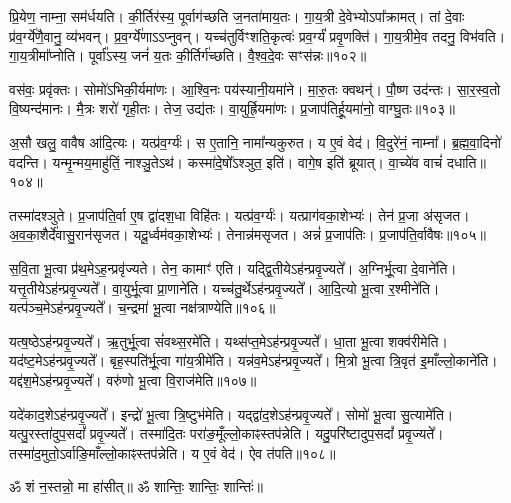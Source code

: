 प्रि॒येण॒ नाम्ना॒ सम॑र्धयति। 
की॒र्तिर॑स्य॒ पूर्वाग॑च्छति ज॒नता॑माय॒तः। 
गा॒य॒त्री दे॒वेभ्योऽपा᳚क्रामत्। 
तां दे॒वाः प्र॑व॒र्ग्ये॑णै॒वानु॒ व्य॑भवन्। 
प्र॒व॒र्ग्ये॑णाऽऽप्नुवन्। 
यच्च॑तुर्विꣳशति॒कृत्वः॑ प्रव॒र्ग्यं॑ प्रवृ॒णक्ति॑। 
गा॒य॒त्रीमे॒व तदनु॒ विभ॑वति। 
गा॒य॒त्रीमा᳚प्नोति। 
पूर्वा᳚ऽस्य॒ जनं॑ य॒तः की॒र्तिर्ग॑च्छति। 
वै॒श्व॒दे॒वः सꣳस॑न्नः॥१०२॥

वस॑वः॒ प्रवृ॑क्तः। 
सोमो॑ऽभिकी॒र्यमा॑णः। 
आ॒श्वि॒नः पय॑स्यानी॒य\-मा॑ने। 
मा॒रु॒तः क्वथन्॑। 
पौ॒ष्ण उद॑न्तः। 
सा॒र॒स्व॒तो वि॒ष्यन्द॑मानः। 
मै॒त्रः  शरो॑ गृही॒तः। 
तेज॒ उद्य॑तः। 
वा॒युर्ह्रि॒यमा॑णः। 
प्र॒जाप॑तिर्\mbox{}हू॒यमा॑नो॒ वाग्घु॒तः॥१०३॥

अ॒सौ खलु॒ वावैष आ॑दि॒त्यः। 
यत्प्र॑व॒र्ग्यः॑। 
स ए॒तानि॒ नामा᳚न्यकुरुत। 
य ए॒वं वेद॑। 
वि॒दुरे॑नं॒ नाम्ना᳚। 
ब्र॒ह्म॒वा॒दिनो॑ वदन्ति। 
यन्मृ॒न्मय॒माहु॑तिं॒ नाश्ञु॒तेऽथ॑। 
कस्मा॑दे॒षो᳚ऽश्ञुत॒ इति॑। 
वागे॒ष इति॑ ब्रूयात्। 
वा॒च्ये॑व वाचं॑ दधाति॥१०४॥

तस्मा॑दश्ञुते। 
प्र॒जाप॑ति॒र्वा ए॒ष द्वा॑दश॒धा विहि॑तः। 
यत्प्र॑व॒र्ग्यः॑। 
यत्प्राग॑वका॒शेभ्यः॑। 
तेन॑ प्र॒जा अ॑सृजत। 
अ॒व॒का॒शैर्दे॑वासु॒रान॑सृजत। 
यदू॒र्ध्वम॑वका॒शेभ्यः॑। 
तेनान्न॑म\-सृजत। 
अन्नं॑ प्र॒जाप॑तिः। 
प्र॒जाप॑ति॒र्वावैषः॥१०५॥
\anuvakamend[व॒द॒न्ति॒ त॒नुवा॒ सꣳस॑न्नो हू॒यमा॑नो॒ वाग्घु॒तो द॑धात्ये॒षः]

स॒वि॒ता भू॒त्वा प्र॑थ॒मेऽह॒न्प्रवृ॑ज्यते। 
तेन॒ कामाꣳ॑ एति। 
यद्द्वि॒तीयेऽह॑न्प्रवृ॒ज्यते᳚। 
अ॒ग्निर्भू॒त्वा दे॒वाने॑ति। 
यत्तृ॒तीयेऽह॑न्प्र\-वृ॒ज्यते᳚। 
वा॒युर्भू॒त्वा प्रा॒णाने॑ति। 
यच्च॑तु॒र्थेऽह॑न्प्रवृ॒ज्यते᳚। 
आ॒दि॒त्यो भू॒त्वा र॒श्मीने॑ति। 
यत्प॑ञ्च॒मेऽह॑न्प्रवृ॒ज्यते᳚। 
च॒न्द्रमा॑ भू॒त्वा नक्ष॑त्राण्येति॥१०६॥

यत्ष॒ष्ठेऽह॑न्प्रवृ॒ज्यते᳚। 
ऋ॒तुर्भू॒त्वा सं॑वथ्स॒रमे॑ति। 
यथ्स॑प्त॒मेऽह॑न्प्र\-वृ॒ज्यते᳚। 
धा॒ता भू॒त्वा शक्व॑रीमेति। 
यद॑ष्ट॒मेऽह॑न्प्रवृ॒ज्यते᳚। 
बृह॒स्पति॑र्भू॒त्वा गा॑य॒त्रीमे॑ति। 
यन्न॑व॒मेऽह॑न्प्रवृ॒ज्यते᳚। 
मि॒त्रो भू॒त्वा त्रि॒वृत॑ इ॒माँल्लो॒काने॑ति। 
यद्द॑श॒मेऽह॑न्प्रवृ॒ज्यते᳚। 
वरु॑णो भू॒त्वा वि॒राज॑मेति॥१०७॥

यदे॑काद॒शेऽह॑न्प्रवृ॒ज्यते᳚। 
इन्द्रो॑ भू॒त्वा त्रि॒ष्टुभ॑मेति। 
यद्द्वा॑द॒शेऽह॑न्प्र\-वृ॒ज्यते᳚। 
सोमो॑ भू॒त्वा सु॒त्यामे॑ति। 
यत्पु॒रस्ता॑दुप॒सदां᳚ प्रवृ॒ज्यते᳚। 
तस्मा॑दि॒तः परा॑ङ॒मूँल्लो॒काꣴ\-स्तप॑न्नेति। 
यदु॒परि॑ष्टादुप॒सदां᳚ प्रवृ॒ज्यते᳚। 
तस्मा॑द॒मुतो॒ऽर्वा\-ङि॒माँल्लो॒काꣴ\-स्तप॑न्नेति। 
य ए॒वं वेद॑। 
ऐव त॑पति॥१०८॥
\anuvakamend[नक्ष॑त्राण्येति वि॒राज॑मेति तपति]

ॐ शं न॒स्तन्नो॒ मा हा॑सीत्॥ ॐ शान्तिः॒ शान्तिः॒ शान्तिः॑॥

\closesection